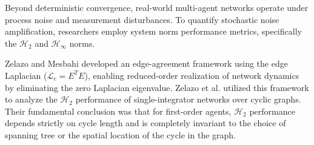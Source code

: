 

Beyond deterministic convergence, real-world multi-agent networks operate under process noise and measurement disturbances. To quantify stochastic noise amplification, researchers employ system norm performance metrics, specifically the $\mathcal{H}_2$ and $\mathcal{H}_\infty$ norms.

Zelazo and Mesbahi \cite{zelazo2010edge} developed an edge-agreement framework using the edge Laplacian ($\mathcal{L}_e = E^T E$), enabling reduced-order realization of network dynamics by eliminating the zero Laplacian eigenvalue. Zelazo et al. \cite{zelazo2013performance} utilized this framework to analyze the $\mathcal{H}_2$ performance of single-integrator networks over cyclic graphs. Their fundamental conclusion was that for first-order agents, $\mathcal{H}_2$ performance depends strictly on cycle length and is completely invariant to the choice of spanning tree or the spatial location of the cycle in the graph.

